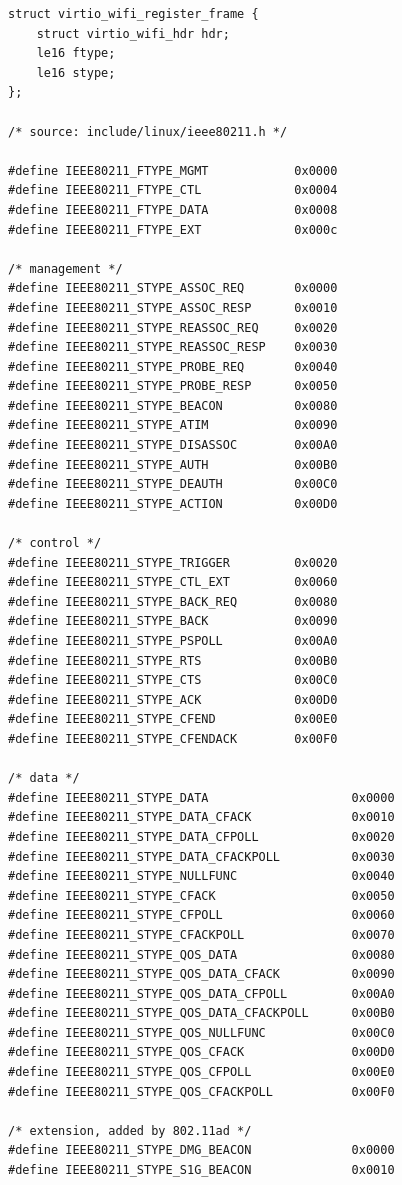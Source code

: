 \begin{lstlisting}
struct virtio_wifi_register_frame {
	struct virtio_wifi_hdr hdr;
	le16 ftype;
	le16 stype;
};

/* source: include/linux/ieee80211.h */

#define IEEE80211_FTYPE_MGMT            0x0000
#define IEEE80211_FTYPE_CTL             0x0004
#define IEEE80211_FTYPE_DATA            0x0008
#define IEEE80211_FTYPE_EXT             0x000c

/* management */
#define IEEE80211_STYPE_ASSOC_REQ       0x0000
#define IEEE80211_STYPE_ASSOC_RESP      0x0010
#define IEEE80211_STYPE_REASSOC_REQ     0x0020
#define IEEE80211_STYPE_REASSOC_RESP    0x0030
#define IEEE80211_STYPE_PROBE_REQ       0x0040
#define IEEE80211_STYPE_PROBE_RESP      0x0050
#define IEEE80211_STYPE_BEACON          0x0080
#define IEEE80211_STYPE_ATIM            0x0090
#define IEEE80211_STYPE_DISASSOC        0x00A0
#define IEEE80211_STYPE_AUTH            0x00B0
#define IEEE80211_STYPE_DEAUTH          0x00C0
#define IEEE80211_STYPE_ACTION          0x00D0

/* control */
#define IEEE80211_STYPE_TRIGGER         0x0020
#define IEEE80211_STYPE_CTL_EXT         0x0060
#define IEEE80211_STYPE_BACK_REQ        0x0080
#define IEEE80211_STYPE_BACK            0x0090
#define IEEE80211_STYPE_PSPOLL          0x00A0
#define IEEE80211_STYPE_RTS             0x00B0
#define IEEE80211_STYPE_CTS             0x00C0
#define IEEE80211_STYPE_ACK             0x00D0
#define IEEE80211_STYPE_CFEND           0x00E0
#define IEEE80211_STYPE_CFENDACK        0x00F0

/* data */
#define IEEE80211_STYPE_DATA                    0x0000
#define IEEE80211_STYPE_DATA_CFACK              0x0010
#define IEEE80211_STYPE_DATA_CFPOLL             0x0020
#define IEEE80211_STYPE_DATA_CFACKPOLL          0x0030
#define IEEE80211_STYPE_NULLFUNC                0x0040
#define IEEE80211_STYPE_CFACK                   0x0050
#define IEEE80211_STYPE_CFPOLL                  0x0060
#define IEEE80211_STYPE_CFACKPOLL               0x0070
#define IEEE80211_STYPE_QOS_DATA                0x0080
#define IEEE80211_STYPE_QOS_DATA_CFACK          0x0090
#define IEEE80211_STYPE_QOS_DATA_CFPOLL         0x00A0
#define IEEE80211_STYPE_QOS_DATA_CFACKPOLL      0x00B0
#define IEEE80211_STYPE_QOS_NULLFUNC            0x00C0
#define IEEE80211_STYPE_QOS_CFACK               0x00D0
#define IEEE80211_STYPE_QOS_CFPOLL              0x00E0
#define IEEE80211_STYPE_QOS_CFACKPOLL           0x00F0

/* extension, added by 802.11ad */
#define IEEE80211_STYPE_DMG_BEACON              0x0000
#define IEEE80211_STYPE_S1G_BEACON              0x0010
\end{lstlisting}

